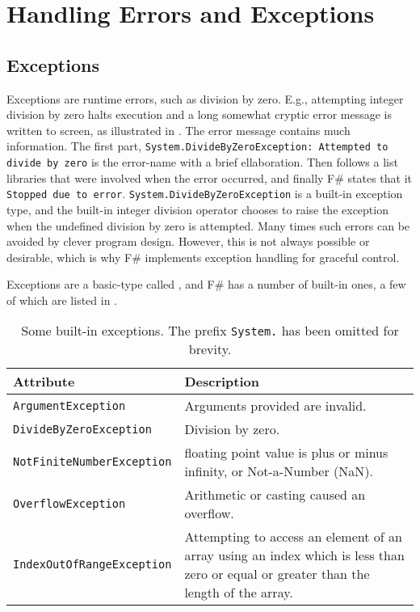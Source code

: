 \documentclass[fsharpnotes.tex]{subfiles}
\begin{document}
\chapter{Handling Errors and Exceptions}
\label{chap:errors}

\section{Exceptions}
\label{sec:exceptions}
Exceptions are runtime errors, such as division by zero. E.g., attempting integer division by zero halts execution and a long somewhat cryptic error message is written to screen, as illustrated in .
%
%
The error message contains much information. The first part, \lstinline[language=console]{System.DivideByZeroException: Attempted to divide by zero} is the error-name with a brief ellaboration. Then follows a list libraries that were involved when the error occurred, and finally F\# states that it \lstinline[language=console]{Stopped due to error}. \lstinline{System.DivideByZeroException} is a built-in exception type, and the built-in integer division operator chooses to raise the exception when the undefined division by zero is attempted. Many times such errors can be avoided by clever program design. However, this is not always possible or desirable, which is why F\# implements exception handling for graceful control.

Exceptions are a basic-type called , and F\# has a number of built-in ones, a few of which are listed in .
\begin{table}
  \centering
  \begin{tabularx}{\linewidth}{|l|X|}
    \hline
    \rowcolor{headerRowColor} Attribute & Description\\
    \hline
    \lstinline!ArgumentException! & Arguments provided are invalid.\\
    \hline
    \lstinline!DivideByZeroException! & Division by zero.\\
    \hline
    \lstinline!NotFiniteNumberException! & floating point value is plus or minus infinity, or Not-a-Number (NaN).\\
    \hline
    \lstinline!OverflowException! & Arithmetic or casting caused an overflow.\\
    \hline
    \lstinline!IndexOutOfRangeException! & Attempting to access an element of an array using an index which is less than zero or equal or greater than the length of the array.\\
    \hline
  \end{tabularx}
  \caption{Some built-in exceptions. The prefix \lstinline{System.} has been omitted for brevity.}
  \label{tab:exceptions}
\end{table}
\end{document}

